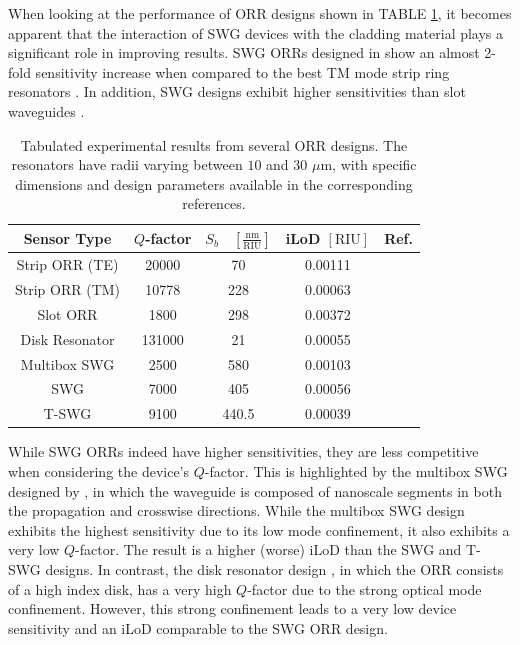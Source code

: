 \documentclass[aps,prl,twocolumn, superscriptaddress,nobalancelastpage]{revtex4}
\begin{document}

When looking at the performance of ORR designs shown in TABLE \ref{tab1}, it becomes apparent that the interaction of SWG devices with the cladding material plays a significant role in improving results. SWG ORRs designed in \cite{swg3} show an almost 2-fold sensitivity increase when compared to the best TM mode strip ring resonators \cite{StripBiosensor}. In addition, SWG designs \cite{swg3, TSWGbio, MultiboxSensor} exhibit higher sensitivities than slot waveguides \cite{SlotBiosensor}.
\pagebreak
\begin{table}[!h]
\centering
\begin{tabular}{|c|c|c|c|c|}
\hline
\textbf{Sensor Type} & \textbf{$Q$-factor} & \textbf{$S_b \quad \left[\frac{\text{nm}}{\text{RIU}}\right] $} & \textbf{iLoD $\left[\text{RIU}\right]$} & \textbf{Ref.} \\ \hline
Strip ORR (TE) & 20000 & 70 & 0.00111 & \cite{TEsensor} \\ \hline
Strip ORR (TM) & 10778 & 228 & 0.00063 & \cite{StripBiosensor} \\ \hline
Slot ORR & 1800 & 298 & 0.00372 & \cite{SlotBiosensor} \\ \hline
Disk Resonator & 131000 & 21 & 0.00055 & \cite{DiskSensor} \\ \hline
Multibox SWG & 2500 & 580 & 0.00103 & \cite{MultiboxSensor} \\ \hline
SWG & 7000 & 405 & 0.00056 & \cite{swg3} \\ \hline
T-SWG & 9100 & 440.5 & 0.00039 & \cite{TSWGbio} \\ \hline
\end{tabular}
\caption{Tabulated experimental results from several ORR designs. The resonators have radii varying between $10$ and $30$ $\mu$m, with specific dimensions and design parameters available in the corresponding references.}
\label{tab1}
\end{table}

While SWG ORRs indeed have higher sensitivities, they are less competitive when considering the device's $Q$-factor. This is highlighted by the multibox SWG designed by \cite{MultiboxSensor}, in which the waveguide is composed of nanoscale segments in both the propagation and crosswise directions. While the multibox SWG design exhibits the highest sensitivity due to its low mode confinement, it also exhibits a very low $Q$-factor. The result is a higher (worse) iLoD than the SWG and T-SWG designs. In contrast, the disk resonator design \cite{DiskSensor}, in which the ORR consists of a high index disk, has a very high $Q$-factor due to the strong optical mode confinement. However, this strong confinement leads to a very low device sensitivity and an iLoD comparable to the SWG ORR design. 
\end{document}
